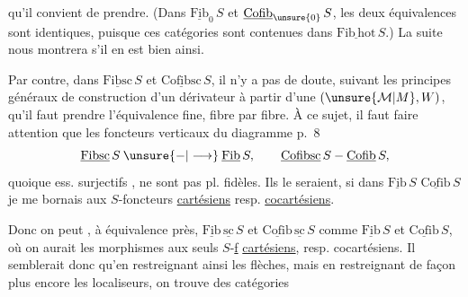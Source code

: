 
qu'il convient de prendre. (Dans $\underline{\mathrm{Fib}}_0\,S$ et $\underline{\mathrm{Cofib}}_{\unsure{0}}\,S$,  les deux équivalences sont identiques, puisque ces  catégories sont contenues dans $\underline{\mathrm{Fib\,hot}}\,S$.) La suite nous montrera s'il en est bien ainsi.

Par contre, dans $\underline{\mathrm{Fibsc}}\,S$ et $\underline{\mathrm{Cofibsc}}\,S$, il n'y a pas de doute, suivant les principes généraux de construction d'un dérivateur à partir d'une $(\unsure{\mathcal M|M},W)$, qu'il faut prendre l'équivalence fine, fibre par fibre. À ce sujet, il faut faire attention que les foncteurs verticaux du diagramme p.~8
\[
\underline{\mathrm{Fibsc}}\,S\mathbin{\unsure{-|\longrightarrow}}\underline{\mathrm{Fib}}\,S,\qquad
\underline{\mathrm{Cofibsc}}\,S\mathbin{-}\underline{\mathrm{Cofib}}\,S,
\]
quoique  ess. surjectifs , ne sont pas pl. fidèles. Ils le seraient,  si dans $\underline{\mathrm{Fib}}\,S$  $\underline{\mathrm{Cofib}}\,S$ je me bornais aux $S$-foncteurs \uline{cartésiens} resp. \uline{cocartésiens}.

Donc on peut , à équivalence près, $\underline{\mathrm{Fib}}\,\underline{\mathrm{sc}}\,S$ et $\underline{\mathrm{Cofib}}\,\underline{\mathrm{sc}}\,S$ comme $\underline{\mathrm{Fib}}\,S$ et $\underline{\mathrm{Cofib}}\,S$, où on aurait  les morphismes aux seuls $S$-\uline{f} \uline{cartésiens}, resp. cocartésiens. Il semblerait donc qu'en restreignant ainsi les flèches, mais en restreignant de façon plus  encore les localiseurs, on trouve des catégories  

